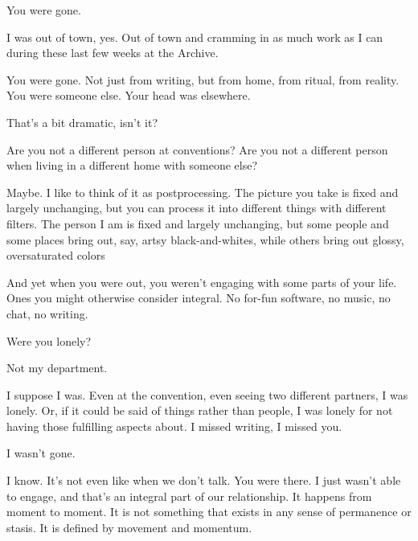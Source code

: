 \begin{ally}
You were gone.
\end{ally}
I was out of town, yes. Out of town and cramming in as much work as I can during these last few weeks at the Archive.

\begin{ally}
You were gone. Not just from writing, but from home, from ritual, from reality. You were someone else. Your head was elsewhere.
\end{ally}
That's a bit dramatic, isn't it?

\begin{ally}
Are you not a different person at conventions? Are you not a different person when living in a different home with someone else?
\end{ally}
Maybe. I like to think of it as postprocessing. The picture you take is fixed and largely unchanging, but you can process it into different things with different filters. The person I am is fixed and largely unchanging, but some people and some places bring out, say, artsy black-and-whites, while others bring out glossy, oversaturated colors

\begin{ally}
And yet when you were out, you weren't engaging with some parts of your life. Ones you might otherwise consider integral. No for-fun software, no music, no chat, no writing.
\end{ally}
Were you lonely?

\begin{ally}
Not my department.
\end{ally}
I suppose I was. Even at the convention, even seeing two different partners, I was lonely. Or, if it could be said of things rather than people, I was lonely for not having those fulfilling aspects about. I missed writing, I missed you.

\begin{ally}
I wasn't gone.
\end{ally}
I know. It's not even like when we don't talk. You were there. I just wasn't able to engage, and that's an integral part of our relationship. It happens from moment to moment. It is not something that exists in any sense of permanence or stasis. It is defined by movement and momentum.
\newpage
